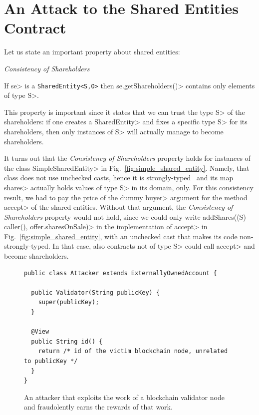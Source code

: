 \section{An Attack to the Shared Entities Contract}\label{sec:attack}

Let us state an important property about shared entities:
%
\vspace{2ex}
\begin{mdframed}[leftmargin=10pt,rightmargin=10pt]
  \begin{center}\emph{Consistency of Shareholders}\end{center}
  \noindent
  If \<se> is a {\codesize\texttt{SharedEntity<S,O>}}
  then \<se.getShareholders()> contains only elements of type \<S>.
\end{mdframed}
\vspace{2ex}
%
This property is important since it states that we can trust the type \<S> of
the shareholders: if one creates a \<SharedEntity> and fixes a specific type \<S>
for its shareholders, then only instances of \<S> will actually manage to become shareholders.

It turns out that the \emph{Consistency of Shareholders} property holds
for instances of the class \<SimpleSharedEntity> in Fig.~\ref{fig:simple_shared_entity}.
Namely, that class does not use unchecked casts, hence it is strongly-typed~\cite{NaftalinW06} and
its map \<shares> actually holds values of type \<S> in its domain, only.
For this consistency result, we had to pay the price
of the dummy \<buyer> argument for the method \<accept>
of the shared entities. Without that argument, the
\emph{Consistency of Shareholders} property would not hold, since we could only write
\<addShares((S) caller(), offer.sharesOnSale)> in the implementation of \<accept> in
Fig.~\ref{fig:simple_shared_entity}, with an unchecked cast that makes its code
non-strongly-typed. In that case, also contracts not of type \<S> could call \<accept>
and become shareholders.

\begin{figure}[ht]
  \begin{center}
    \begin{lstlisting}[language=Takamaka]
public class Attacker extends ExternallyOwnedAccount {

  public Validator(String publicKey) {
    super(publicKey);
  }

  @View
  public String id() {
    return /* id of the victim blockchain node, unrelated to publicKey */
  }
}
    \end{lstlisting}
  \end{center}
  \caption{An attacker that exploits the work of a blockchain validator node and fraudolently earns the rewards of that work.}\label{fig:attacker}
\end{figure}

